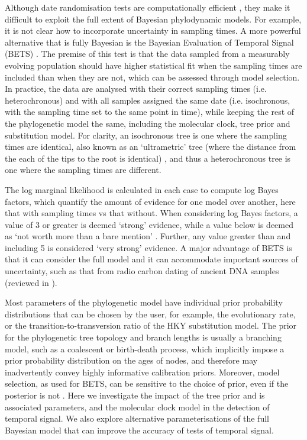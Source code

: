 \documentclass[10pt,letterpaper]{article}
\begin{document}
{Although date randomisation tests are computationally efficient \cite{duchene2018inferring}, they make it difficult to exploit the full extent of Bayesian phylodynamic models. For example, it is not clear how to incorporate uncertainty in sampling times. A more powerful alternative that is fully Bayesian is the Bayesian Evaluation of Temporal Signal (BETS) \cite{duchene2020bayesian}.} The premise of this test is that the data sampled from a measurably evolving population should have higher statistical fit when the sampling times are included than when they are not, which can be assessed through model selection. In practice, the data are analysed with their correct sampling times (i.e. heterochronous) and with all samples assigned the same date (i.e. isochronous, with the sampling time set to the same point in time), while keeping the rest of the phylogenetic model the same, including the molecular clock, tree prior and substitution model. {For clarity, an isochronous tree is one where the sampling times are identical, also known as an `ultrametric' tree (where the distance from the each of the tips to the root is identical) \cite{duchene2020bayesian, gavryushkin2016space}, and thus a heterochronous tree is one where the sampling times are different.}

The log marginal likelihood is calculated in each case to compute log Bayes factors, which quantify the amount of evidence for one model over another, here that with sampling times vs that without. {When considering log Bayes factors, a value of 3 or greater is deemed `strong' evidence, while a value below is deemed as `not worth more than a bare mention' \cite{kass1995bayes}. Further, any value greater than and including 5 is considered `very strong' evidence.} A major advantage of BETS is that it can consider the full model and it can accommodate important sources of uncertainty, such as that from radio carbon dating of ancient DNA samples \cite{molak2015empirical} (reviewed in \cite{spyrou2019ancient, duchene2020recovery}). 

Most parameters of the phylogenetic model have individual prior probability distributions that can be chosen by the user, for example, the evolutionary rate, or the transition-to-transversion ratio of the HKY substitution model. The prior for the phylogenetic tree topology and branch lengths is usually a branching model, such as a coalescent or birth-death process, which implicitly impose a prior probability distribution on the ages of nodes, and therefore may inadvertently convey highly informative calibration priors. Moreover, model selection, as used for BETS, can be sensitive to the choice of prior, even if the posterior is not \cite{gelman1995avoiding, gelman2014bayesian}. Here we investigate the impact of the tree prior and is associated parameters, and the molecular clock model in the detection of temporal signal. We also explore alternative parameterisations of the full Bayesian model that can improve the accuracy of tests of temporal signal.
\end{document}
